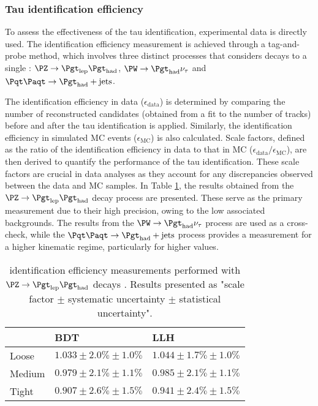 \subsubsection{Tau identification efficiency}
To assess the effectiveness of the tau identification,
experimental data is directly used. The identification efficiency measurement
is achieved through a tag-and-probe method, which involves three distinct processes 
that considers decays to a single \tauhad:  $\PZ \rightarrow \taulep \tauhad$, 
$\PW \rightarrow \tauhad \nu_{\tau}$ and $\ttbar \rightarrow \tauhad + \text{jets}$.
 
The identification efficiency in data ($\epsilon_{\text{data}}$) is determined by comparing the
number of reconstructed \tauhad candidates (obtained from a fit to the number of tracks) before 
and after the tau identification is applied.  Similarly, the identification efficiency in simulated MC
events ($\epsilon_{\text{MC}}$) is also calculated. Scale factors, defined as the ratio of the 
identification efficiency in data to that in MC ($\epsilon_{\text{data}}/\epsilon_{\text{MC}}$), are 
then derived to quantify the performance of the tau identification. These scale factors are crucial 
in data analyses as they account for any discrepancies observed between the data and MC 
samples. In Table \ref{tab:Chap3:Reco:Tau:eff}, the results obtained from the 
$\PZ \rightarrow \taulep \tauhad$ decay process are presented. These serve as the primary
 measurement due to their high precision, owing to the low associated backgrounds.
The results from the $\PW \rightarrow \tauhad \nu_{\tau}$ process are used as a cross-check, 
while the $\ttbar \rightarrow \tauhad + \text{jets}$ process provides a measurement for a higher
 kinematic regime, particularly for higher \pT values.

\begin{table}[]
\centering
\begin{tabular}{l|l|l}
\toprule
       		& BDT                       				& LLH                 \\ \midrule
Loose  	& $1.033 \pm 2.0\% \pm 1.0\%$ 	& $1.044 \pm 1.7\% \pm 1.0\%$ \\
Medium 	& $0.979 \pm 2.1\% \pm 1.1\%$    	& $0.985 \pm 2.1\% \pm 1.1\%$ \\
Tight  	& $0.907 \pm 2.6\% \pm 1.5\%$    	& $0.941 \pm 2.4\% \pm 1.5\%$ \\ \bottomrule
\end{tabular}
\caption{\tauhad identification efficiency measurements performed with $\PZ \rightarrow \taulep \tauhad$ decays \cite{Leister:1609659}. 
Results presented as "scale factor $\pm$ systematic uncertainty $\pm$ statistical uncertainty".}
\label{tab:Chap3:Reco:Tau:eff}
\end{table}

